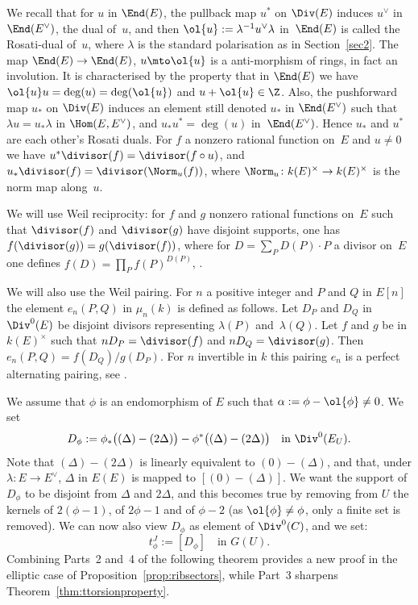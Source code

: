 We recall that for $u$ in $\End(E)$, the pullback map $u^*$ on
$\Div(E)$ induces $u^\vee$ in $\End(E^\vee)$, the dual of~$u$, and
then $\ol{u}:=\lambda^{-1} u^\vee\lambda$ in~$\End(E)$ is called the
Rosati-dual of~$u$, where $\lambda$ is the standard polarisation as in
Section~\ref{sec2}. The map $\End(E)\to\End(E)$, $u\mto \ol{u}$ is
a anti-morphism of rings, in fact an involution. It is characterised
by the property that in $\End(E)$ we have
$\ol{u}u=\deg(u)=\deg(\ol{u})$ and $u+\ol{u}\in\Z$. Also, the
pushforward map $u_*$ on $\Div(E)$ induces an element still denoted
$u_*$ in $\End(E^\vee)$ such that $\lambda u=u_*\lambda$ in $\Hom(E,
E^\vee)$, and $u_*u^*=\deg(u)$ in~$\End(E^\vee)$. Hence $u_*$ and
$u^*$ are each other's Rosati duals. For $f$ a nonzero rational function
on~$E$ and $u\neq 0$ we have $u^*\divisor(f)=\divisor(f\circ u)$, and
$u_*\divisor(f)=\divisor(\Norm_u(f))$, where $\Norm_u\colon
k(E)^\times\to k(E)^\times$ is the norm map along~$u$.

We will use Weil reciprocity: for $f$ and $g$ nonzero rational
functions on~$E$ such that $\divisor(f)$ and $\divisor(g)$ have
disjoint supports, one has $f(\divisor(g))=g(\divisor(f))$, where for
$D=\sum_PD(P){\cdot}P$ a divisor on~$E$ one defines
$f(D)=\prod_Pf(P)^{D(P)}$, \cf \cite[III, Prop.\,7]{Serre}.

We will also use the Weil pairing. For $n$ a positive integer and $P$
and $Q$ in $E[n]$ the element $e_n(P,Q)$ in $\mu_n(k)$ is defined as
follows. Let $D_P$ and $D_Q$ in $\Div^0(E)$ be disjoint divisors
representing $\lambda(P)$ and~$\lambda(Q)$. Let $f$ and $g$ be in
$k(E)^\times$ such that $nD_P=\divisor(f)$ and
$nD_Q=\divisor(g)$. Then $e_n(P,Q)=f(D_Q)/g(D_P)$. For $n$ invertible
in $k$ this pairing $e_n$ is a perfect alternating pairing, see
\cite[Chap.\,12, Rem.\,3.7]{Husemoller}.

We assume that $\phi$ is an endomorphism of $E$ such that
$\alpha:=\phi-\ol{\phi}\neq 0$. We set
\begin{equation}
\label{eq:def_D}
D_\phi := \phi_*\big((\Delta)-(2\Delta)\big) -
\phi^*\big((\Delta)-(2\Delta)\big)
\quad\text{in $\Div^0(E_U)$}.
\end{equation}
Note that $(\Delta)-(2\Delta)$ is linearly equivalent to
$(0)-(\Delta)$, and that, under $\lambda\colon E\to E^\vee$, $\Delta$
in $E(E)$ is mapped to $[(0)-(\Delta)]$.
We want the support of $D_\phi$ to be disjoint from $\Delta$ and
$2\Delta$, and this becomes true by removing from $U$ the kernels of
$2(\phi-1)$, of $2\phi-1$ and of $\phi-2$ (as $\ol{\phi}\neq\phi$,
only a finite set is removed). We can now also view $D_\phi$ as
element of $\Div^0(C)$, and we set:
\begin{equation}
\label{eq:def_sJ}
t^J_\phi := [D_\phi] \quad\text{in $G(U)$.}
\end{equation}
Combining Parts~2 and~4 of the following theorem
provides a new proof in the elliptic case of Proposition~\ref{prop:ribsectors},
while Part~3 sharpens Theorem~\ref{thm:ttorsionproperty}.

